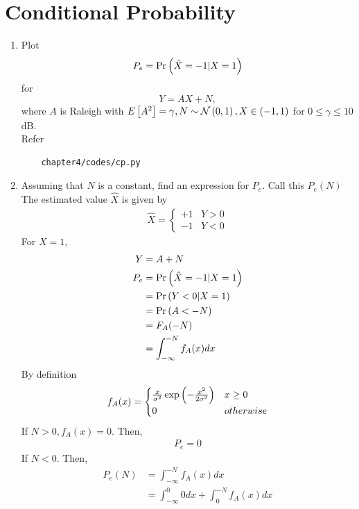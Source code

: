 \section{Conditional Probability}
\begin{enumerate}
\item
\label{ch4_sim}
Plot 
\begin{equation}
P_e = \Pr\left(\hat{X} = -1|X=1\right)
\end{equation}
%
for 
\begin{equation}
Y = AX+N,
\end{equation}
where $A$ is Raleigh with $E{}\left[A^2\right] = \gamma, N \sim \mathcal{N}\left(0,1\right), X \in \left(-1,1\right)$ for $0 \le \gamma \le 10$ dB.\\
\solution Refer  
\begin{lstlisting}
	chapter4/codes/cp.py
\end{lstlisting}
%
\item
Assuming that $N$ is a constant, find an expression for $P_e$.  Call this $P_e(N)$\\
\solution \solution The estimated value $\hat{X}$ is given by
\begin{align}
\hat{X} = 
\begin{cases}
+1 & Y>0\\
-1 & Y<0
\end{cases}
\end{align}
For $X = 1$, 
\begin{align}
Y &= A + N\\
P_e &= \Pr\left(\hat{X} = -1|X=1\right) \\
&= \Pr\left(Y<0 |X=1\right)\\
&= \Pr\left(A<-N\right)\\
&= F_A(-N)\\
&= \int_{-\infty}^{-N} f_A(x)dx
\end{align}
By definition
\begin{align}
f_A(x) = 
\begin{cases}
\frac{x}{\sigma^2}\exp\left({-\frac{x^2}{2\sigma^2}}\right) & x\geq0\\
0 & otherwise
\end{cases}
\end{align}
If $N>0, f_A(x) = 0$. Then,
\begin{align}
 P_e=0  
\end{align}
If $N<0$. Then,
\begin{align}
 P_e(N) &=\int_{-\infty}^{-N} f_A(x)dx\\
 &=\int_{-\infty}^{0} 0dx+\int_{0}^{-N} f_A(x)dx\\

\end{align}
\end{enumerate}
